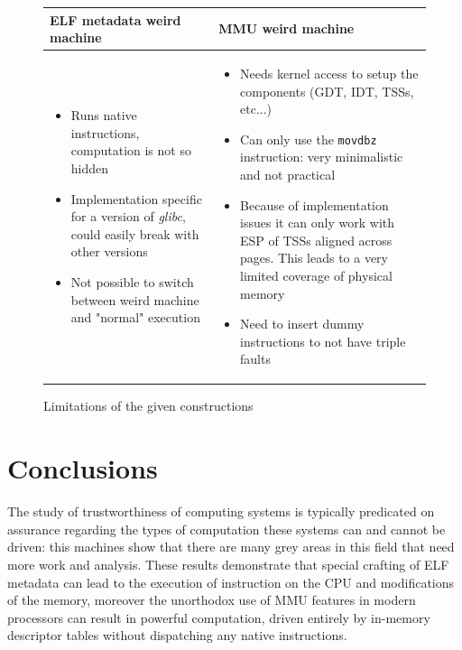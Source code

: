 \documentclass[11pt,twoside,a4paper]{article}
\begin{document}
\begin{figure}[ht!]
\begin{longtable}{ p{} | p{} }
\bfseries{ELF metadata weird machine} & \bfseries{MMU weird machine} \\ \hline
\begin{itemize}[noitemsep,topsep={0pt},partopsep={0pt}]
\item Runs native instructions, computation is not so hidden
\item Implementation specific for a version of \emph{glibc}, could easily break with other versions
\item Not possible to switch between weird machine and "normal" execution
\vspace{-0.5cm}
\end{itemize}
&
\begin{itemize}[noitemsep,topsep={0pt},partopsep={0pt}]
\item Needs kernel access to setup the components (GDT, IDT, TSSs, etc...)
\item Can only use the \texttt{movdbz} instruction: very minimalistic and not practical
\item Because of implementation issues it can only work with ESP of TSSs aligned across pages. This leads to a very limited coverage of physical memory
\item Need to insert dummy instructions to not have triple faults
\vspace{-0.5cm}
\end{itemize}
\end{longtable}
\caption{Limitations of the given constructions}
\vspace{-0.8cm}
\label{disadvantages}
\end{figure}


\section{Conclusions}

The study of trustworthiness of computing systems is typically predicated on assurance regarding the types of computation these systems can and cannot be driven: this machines show that there are many grey areas in this field that need more work and analysis.
These results demonstrate that special crafting of ELF metadata can lead to the execution of instruction on the CPU and modifications of the memory, moreover the unorthodox use of MMU features in modern processors can result in powerful computation, driven entirely by in-memory descriptor tables without dispatching any native instructions.
\end{document}

